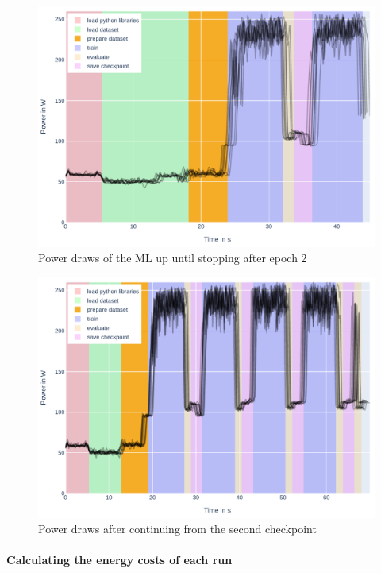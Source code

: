 \begin{figure}
    \includegraphics[width=\linewidth]{power-measurements/stacked_plots/roberta_stop_without_saving.pdf}
    \caption{Power draws of the ML up until stopping after epoch 2}
    \label{fig:plot_partial_abort_stacked}
\end{figure}

\begin{figure}
    \includegraphics[width=\linewidth]{power-measurements/stacked_plots/roberta_continue_after_not_saving.pdf}
    \caption{Power draws after continuing from the second checkpoint}
    \label{fig:plot_partial_abort_continue_stacked}
\end{figure}

\paragraph{Calculating the energy costs of each run}

